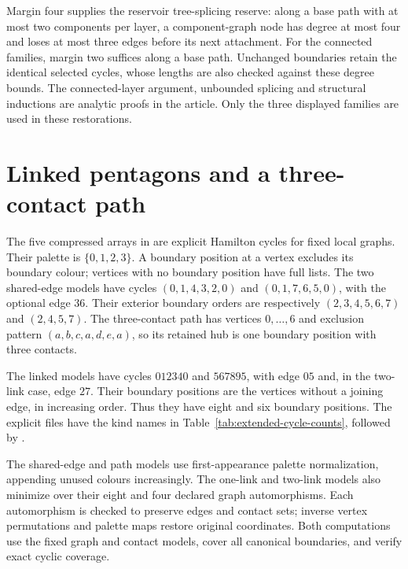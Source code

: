 Margin four supplies the reservoir tree-splicing reserve: along a base
path with at most two components per layer, a component-graph node has degree
at most four and loses at most three edges before its next attachment.
For the connected families, margin two suffices along a base path.
Unchanged boundaries retain the identical selected cycles, whose lengths
are also checked against these degree bounds. The connected-layer argument,
unbounded splicing and structural inductions are analytic proofs in the
article. Only the three displayed families are used in these restorations.

\clearpage
\section{Linked pentagons and a three-contact path}
\label{app:extended-cycle-constructions}
The five compressed arrays in  are explicit
Hamilton cycles for fixed local graphs. Their palette is $\{0,1,2,3\}$.
A boundary position at a vertex excludes its boundary colour; vertices with no boundary position
have full lists. The two shared-edge models have cycles
$(0,1,4,3,2,0)$ and $(0,1,7,6,5,0)$, with the optional edge $36$.
Their exterior boundary orders are respectively $(2,3,4,5,6,7)$ and $(2,4,5,7)$.
The three-contact path has vertices $0,\ldots,6$ and exclusion pattern
$(a,b,c,a,d,e,a)$, so its retained hub is one boundary position with three contacts.

The linked models have cycles $012340$ and $567895$, with edge $05$
and, in the two-link case, edge $27$. Their boundary positions are the vertices
without a joining edge, in increasing order. Thus they have eight
and six boundary positions. The explicit files have the kind names in
Table~\ref{tab:extended-cycle-counts}, followed by .

The shared-edge and path models use first-appearance palette
normalization, appending unused colours increasingly. The one-link
and two-link models also minimize over their eight and four declared
graph automorphisms. Each automorphism is checked to preserve edges
and contact sets; inverse vertex permutations and palette maps restore original coordinates. Both computations use the fixed graph and contact models, cover all
canonical boundaries, and verify exact cyclic coverage.

